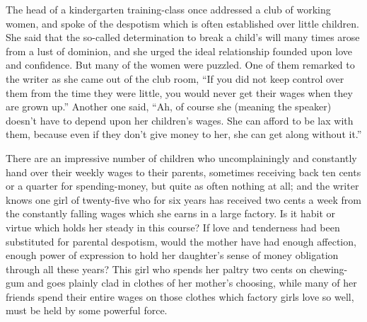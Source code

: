 \documentclass[]{article}
\begin{document}
\begin{sectionbody}
\addamsparagraph The head of a kindergarten training-class once addressed a club of
working women, and spoke of the despotism which is often established
over little children. She said that the so-called determination to break
a child's will many times arose from a lust of dominion, and she urged
the ideal relationship founded upon love and confidence. But many of the
women were puzzled. One of them remarked to the writer as she came out
of the club room, ``If you did not keep control over them from the time
they were little, you would never get their wages when they are grown
up.'' Another one said, ``Ah, of course she (meaning the speaker) doesn't
have to depend upon her children's wages. She can afford to be lax with
them, because even if they don't give money to her, she can get along
without it.''

\addamsparagraph There are an impressive number of children who uncomplainingly and
constantly hand over their weekly wages to their parents, sometimes
receiving back ten cents or a quarter for spending-money, but quite as
often nothing at all; and the writer knows one girl of twenty-five who
for six years has received two cents a week from the constantly falling
wages which she earns in a large factory. Is it habit or virtue which
holds her steady in this course? If love and tenderness had been
substituted for parental despotism, would the mother have had enough
affection, enough power of expression to hold her daughter's sense of
money obligation through all these years? This girl who spends her
paltry two cents on chewing-gum and goes plainly clad in clothes of her
mother's choosing, while many of her friends spend their entire wages on
those clothes which factory girls love so well, must be held by some
powerful force.


\end{sectionbody}
\end{document}
